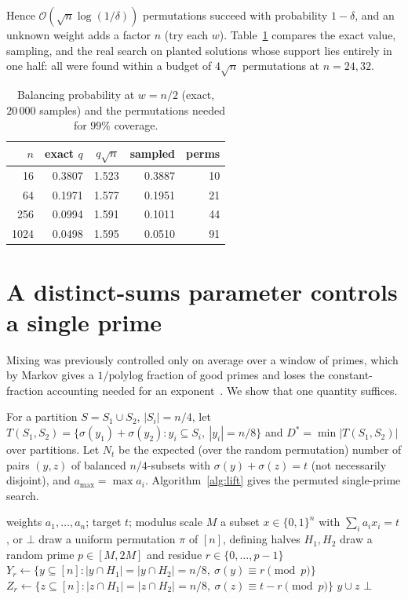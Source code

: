 \documentclass[conference]{IEEEtran}
\newcommand{\Oh}{\mathcal{O}}
\begin{document}
Hence $\Oh(\sqrt n\log(1/\delta))$ permutations succeed with probability
$1-\delta$, and an unknown weight adds a factor $n$ (try each $w$).
Table~\ref{tab:profile} compares the exact value, sampling, and the real
search on planted solutions whose support lies entirely in one half: all were
found within a budget of $4\sqrt n$ permutations at $n=24,32$.

\begin{table}[t]
\centering
\caption{Balancing probability at $w=n/2$ (exact, $20\,000$ samples) and the
permutations needed for $99\%$ coverage.}
\label{tab:profile}
\begin{tabular}{rrrrr}
\toprule
$n$ & exact $q$ & $q\sqrt n$ & sampled & perms\\
\midrule
16 & 0.3807 & 1.523 & 0.3887 & 10\\
64 & 0.1971 & 1.577 & 0.1951 & 21\\
256 & 0.0994 & 1.591 & 0.1011 & 44\\
1024 & 0.0498 & 1.595 & 0.0510 & 91\\
\bottomrule
\end{tabular}
\end{table}

\section{A distinct-sums parameter controls a single prime}\label{sec:lift}
Mixing was previously controlled only on average over a window of primes, which
by Markov gives a $1/\mathrm{polylog}$ fraction of good primes and loses the
constant-fraction accounting needed for an exponent~\cite{mixing}. We show that
one quantity suffices.

For a partition $S=S_1\cup S_2$, $|S_i|=n/4$, let
$T(S_1,S_2)=\{\sigma(y_1)+\sigma(y_2): y_i\subseteq S_i,\ |y_i|=n/8\}$
and $D^*=\min|T(S_1,S_2)|$ over partitions. Let $N_t$ be the expected (over the random permutation) number of pairs
$(y,z)$ of balanced $n/4$-subsets with $\sigma(y)+\sigma(z)=t$ (not
necessarily disjoint), and $a_{\max}=\max a_i$. Algorithm~\ref{alg:lift} gives the
permuted single-prime search.

\begin{algorithm}[t]
\caption{Permuted representation search for a scale guess $M$}
\label{alg:lift}
\begin{algorithmic}[1]
\Require weights $a_1,\dots,a_n$; target $t$; modulus scale $M$
\Ensure a subset $x\in\{0,1\}^n$ with $\sum_i a_i x_i = t$, or $\bot$
\State draw a uniform permutation $\pi$ of $[n]$, defining halves $H_1,H_2$
\State draw a random prime $p\in[M,2M]$ and residue $r\in\{0,\dots,p-1\}$
\State $Y_r\gets\{y\subseteq[n]: |y\cap H_1|=|y\cap H_2|=n/8,\ \sigma(y)\equiv r\pmod p\}$
\State $Z_r\gets\{z\subseteq[n]: |z\cap H_1|=|z\cap H_2|=n/8,\ \sigma(z)\equiv t-r\pmod p\}$
 
    \State \Return $y\cup z$
  \EndIf
\EndFor
\State \Return $\bot$
\end{algorithmic}
\end{algorithm}
\end{document}
